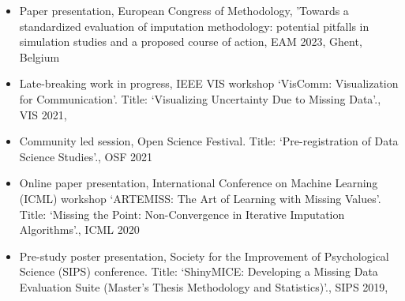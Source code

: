 \documentclass[
  letterpaper,
  DIV=11,
  numbers=noendperiod,
  oneside]{scrartcl}
\providecommand{\tightlist}{%
  \setlength{\itemsep}{0pt}\setlength{\parskip}{0pt}}\usepackage{longtable,booktabs,array}
\begin{document}
{}

\begin{itemize}
\tightlist
\item
  Paper presentation, European Congress of Methodology, 'Towards a
  standardized evaluation of imputation methodology: potential pitfalls
  in simulation studies and a proposed course of action, EAM 2023,
  Ghent, Belgium
\end{itemize}

{}

\begin{itemize}
\tightlist
\item
  Late-breaking work in progress, IEEE VIS workshop `VisComm:
  Visualization for Communication'. Title: `Visualizing Uncertainty Due
  to Missing Data'., VIS 2021,
\end{itemize}

{}

\begin{itemize}
\tightlist
\item
  Community led session, Open Science Festival. Title: `Pre-registration
  of Data Science Studies'., OSF 2021
\end{itemize}

{}

\begin{itemize}
\tightlist
\item
  Online paper presentation, International Conference on Machine
  Learning (ICML) workshop `ARTEMISS: The Art of Learning with Missing
  Values'. Title: `Missing the Point: Non-Convergence in Iterative
  Imputation Algorithms'., ICML 2020
\end{itemize}

{}

\begin{itemize}
\tightlist
\item
  Pre-study poster presentation, Society for the Improvement of
  Psychological Science (SIPS) conference. Title: `ShinyMICE: Developing
  a Missing Data Evaluation Suite (Master's Thesis Methodology and
  Statistics)'., SIPS 2019,
\end{itemize}
\end{document}
